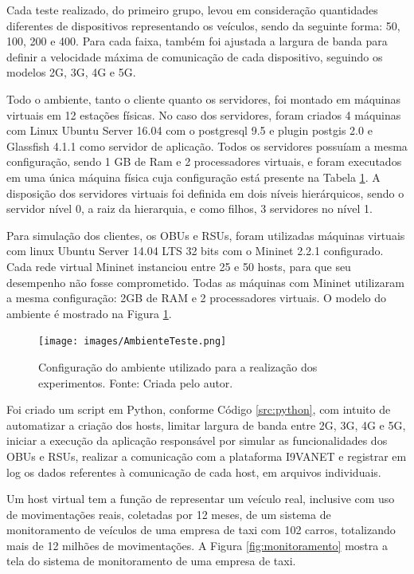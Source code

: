 \documentclass[
	12pt,				%
	oneside,			%
	a4paper,			%
	english,			%
	brazil				%
	]{abntex2ppgsi}
\begin{document}
Cada teste realizado, do primeiro grupo, levou em consideração quantidades diferentes de dispositivos representando os veículos, sendo da seguinte forma: 50, 100, 200 e 400. Para cada faixa, também foi ajustada a largura de banda para definir a velocidade máxima de comunicação de cada dispositivo, seguindo os modelos 2G, 3G, 4G e 5G.

Todo o ambiente, tanto o cliente quanto os servidores, foi montado em máquinas virtuais em 12 estações físicas. No caso dos servidores,  foram criados 4 máquinas com Linux Ubuntu Server 16.04 com o postgresql 9.5 e plugin postgis 2.0 e Glassfish 4.1.1 como servidor de aplicação. Todos os servidores possuíam a mesma configuração, sendo 1 GB de Ram e 2 processadores virtuais, e foram executados em uma única máquina física cuja configuração está presente na Tabela \ref{fig:cenarioConsiderado}. A disposição dos servidores virtuais foi definida em dois níveis hierárquicos, sendo o servidor nível 0, a raiz da hierarquia, e como filhos,  3 servidores no nível 1.


Para simulação dos clientes, os OBUs e RSUs, foram utilizadas máquinas virtuais com linux Ubuntu Server 14.04 LTS 32 bits com o Mininet 2.2.1 configurado. Cada rede virtual Mininet instanciou entre 25 e 50 hosts, para que seu desempenho não fosse comprometido. Todas as máquinas com Mininet  utilizaram a mesma configuração:  2GB de RAM e 2 processadores virtuais. O modelo do ambiente é mostrado na Figura \ref{fig:cenarioConsiderado}.


\begin{figure}[h!]
	\centering
	\texttt{[image: images/AmbienteTeste.png]}
	\caption{Configuração do ambiente utilizado para a realização dos experimentos. Fonte: Criada pelo autor.}
	\label{fig:cenarioConsiderado}
\end{figure}

Foi criado um script em Python, conforme Código \ref{src:python}, com intuito de automatizar a criação dos hosts, limitar largura de banda entre 2G, 3G, 4G e 5G, iniciar a execução da aplicação responsável por simular as funcionalidades dos OBUs e RSUs,  realizar a comunicação com a plataforma I9VANET e registrar em log os dados referentes à comunicação de cada host, em arquivos individuais.

Um host virtual tem a função de representar um veículo real, inclusive com uso de movimentações reais, coletadas por 12 meses, de um sistema de monitoramento de veículos de uma empresa de taxi com 102 carros, totalizando mais de 12 milhões de movimentações. A Figura \ref{fig:monitoramento} mostra a tela do sistema de monitoramento de uma empresa de taxi.
\end{document}
